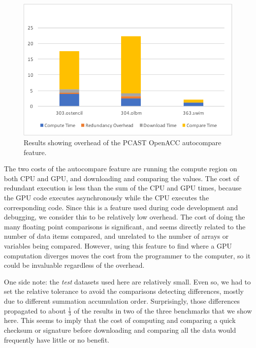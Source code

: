 \begin{figure}[t]
    \centering
    \includegraphics [width=1\linewidth] {npic2.pdf}
    \caption{Results showing overhead of the PCAST OpenACC autocompare feature.}
    \label{fig:sle_figure}
\end{figure}


The two costs of the autocompare feature are running the compute region on both CPU and GPU, and downloading and comparing the values.
The cost of redundant execution is less than the sum of the CPU and GPU times, because the GPU code executes asynchronously while the CPU executes the corresponding code.
Since this is a feature used during code development and debugging, we consider this to be relatively low overhead.
The cost of doing the many floating point comparisons is significant, and seems directly related to the number of data items compared, and unrelated to the number of arrays or variables being compared.
However, using this feature to find where a GPU computation diverges moves the cost from the programmer to the computer, so it could be invaluable regardless of the overhead.

One side note: the \emph{test} datasets used here are relatively small.
Even so, we had to set the relative tolerance to avoid the comparisons detecting differences, mostly due to different summation accumulation order.
Surprisingly, those differences propagated to about $\frac{1}{3}$ of the results in two of the three benchmarks that we show here.
This seems to imply that the cost of computing and comparing a quick checksum or signature before downloading and comparing all the data would frequently have little or no benefit.
